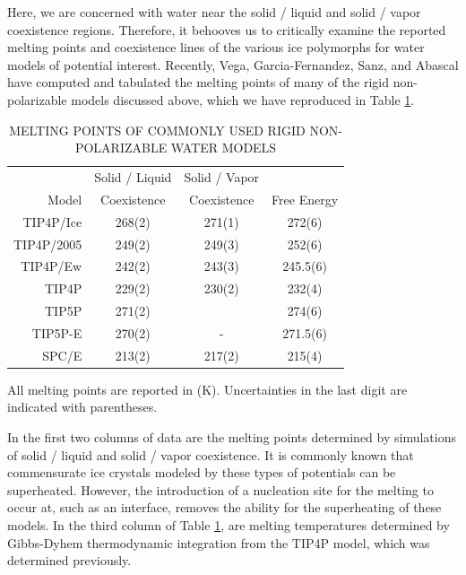 Here, we are concerned with water near the solid / liquid and solid /
vapor coexistence regions. Therefore, it behooves us to critically
examine the reported melting points and coexistence lines of the
various ice polymorphs for water models of potential
interest. Recently, Vega, Garcia-Fernandez, Sanz, and Abascal have
computed and tabulated the melting points of many of the rigid
non-polarizable models discussed above, which we have reproduced in
Table
\ref{tab:meltingPoints}.\cite{Abascal2005,Abascal2005a,Vega2005,Vega2005a,Fernandez2006,Vega2006a}

\begin{table}[h]
\centering
\caption{MELTING POINTS OF COMMONLY USED RIGID NON-POLARIZABLE
        WATER MODELS \cite{Abascal2005,Abascal2005a,Vega2005,Vega2005a,Fernandez2006,Vega2006a}\label{tab:meltingPoints}} 
\begin{tabular}{rccc}
\hline \hline
& Solid / Liquid & Solid / Vapor & \\
Model & Coexistence & Coexistence & Free Energy \\
\hline
TIP4P/Ice & 268(2) & 271(1) & 272(6) \\
TIP4P/2005 & 249(2) & 249(3) & 252(6) \\
TIP4P/Ew & 242(2) & 243(3) & 245.5(6) \\
TIP4P & 229(2) & 230(2) & 232(4) \\
TIP5P & 271(2) & & 274(6) \\
TIP5P-E & 270(2) & - & 271.5(6) \\
SPC/E & 213(2) & 217(2) & 215(4) \\
\hline \hline
\end{tabular}
\flushleft
All melting points are reported in (K). 
Uncertainties in the last digit are indicated with parentheses. \\
\end{table}

In the first two columns of data are the melting points determined by
simulations of solid / liquid and solid / vapor coexistence. It is
commonly known that commensurate ice crystals modeled by these types
of potentials can be superheated.\cite{Vega2006a} However, the
introduction of a nucleation site for the melting to occur at, such as
an interface, removes the ability for the superheating of these
models. In the third column of Table \ref{tab:meltingPoints}, are
melting temperatures determined by Gibbs-Dyhem thermodynamic
integration\cite{Kofke1993} from the TIP4P model, which was determined
previously.\cite{Sanz2004}

